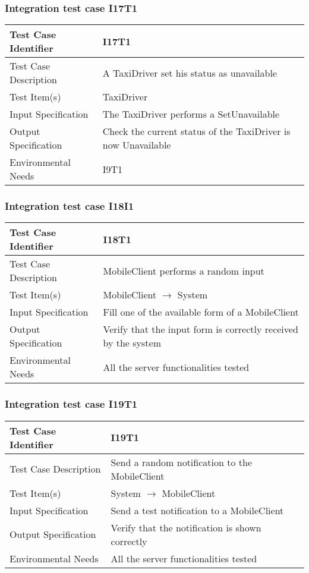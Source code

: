 \subsubsection{Integration test case I17T1}
\begin{center}
  \begin{tabular}{ |l p{10cm}| } \hline
    Test Case Identifier & I17T1 \\ \hline
    Test Case Description & A TaxiDriver set his status as unavailable  \\ \hline
    Test Item(s) & TaxiDriver \\ \hline
    Input Specification & The TaxiDriver performs a SetUnavailable \\ \hline
    Output Specification & Check the current status of the TaxiDriver is now Unavailable \\ \hline
    Environmental Needs & I9T1 \\ \hline
  \end{tabular}
\end{center}
\subsubsection{Integration test case I18I1}
\begin{center}
  \begin{tabular}{ |l p{10cm}| } \hline
    Test Case Identifier & I18T1 \\ \hline
    Test Case Description & MobileClient performs a random input \\ \hline
    Test Item(s) & MobileClient $\rightarrow$ System \\ \hline
    Input Specification & Fill one of the available form of a MobileClient \\ \hline
    Output Specification & Verify that the input form is correctly received by the system \\ \hline
    Environmental Needs & All the server functionalities tested \\ \hline
  \end{tabular}
\end{center}
\subsubsection{Integration test case I19T1}
\begin{center}
  \begin{tabular}{ |l p{10cm}| } \hline
    Test Case Identifier & I19T1 \\ \hline
    Test Case Description & Send a random notification to the MobileClient \\ \hline
    Test Item(s) & System $\rightarrow$ MobileClient \\ \hline
    Input Specification & Send a test notification to a MobileClient \\ \hline
    Output Specification & Verify that the notification is shown correctly \\ \hline
    Environmental Needs & All the server functionalities tested \\ \hline
  \end{tabular}
\end{center}
